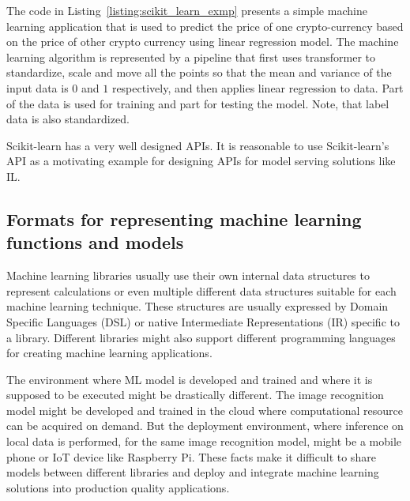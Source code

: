 \documentclass[english, 12pt, a4paper, elec, utf8, online]{aaltothesis}
\begin{document}
The code in Listing~\ref{listing:scikit_learn_exmp} presents a simple machine learning application that is used to predict the price of one crypto-currency based on the price of other crypto currency using linear regression model. The machine learning algorithm is represented by a pipeline that first uses transformer to standardize, scale and move all the points so that the mean and variance of the input data is $0$ and $1$ respectively, and then applies linear regression to data. Part of the data is used for training and part for testing the model. Note, that label data is also standardized. 



Scikit-learn has a very well designed APIs. It is reasonable to use Scikit-learn's API as a motivating example for designing APIs for model serving solutions like IL. 
    
\subsection{Formats for representing machine learning functions and models} 
Machine learning libraries usually use their own internal data structures to represent calculations or even multiple different data structures suitable for each machine learning technique. These structures are usually expressed by Domain Specific Languages (DSL) or native Intermediate Representations (IR) specific to a library. Different libraries might also support different programming languages for creating machine learning applications.

The environment where ML model is developed and trained and where it is supposed to be executed might be drastically different. The image recognition model might be developed and trained in the cloud where computational resource can be acquired on demand. But the deployment environment, where inference on local data is performed, for the same image recognition model, might be a mobile phone or IoT device like Raspberry Pi. These facts make it difficult to share models between different libraries and deploy and integrate machine learning solutions into production quality applications. 
\end{document}
